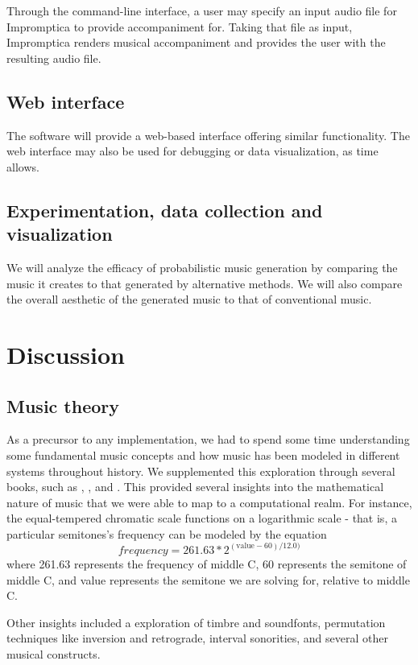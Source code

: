 \documentclass[11pt,conference,letterpaper]{IEEEtran}
\begin{document}
Through the command-line interface, a user may specify an input audio file for Impromptica to provide accompaniment for. Taking that file as input, Impromptica renders musical accompaniment and provides the user with the resulting audio file.

\subsection{Web interface}

The software will provide a web-based interface offering similar functionality. The web interface may also be used for debugging or data visualization, as time allows.

\subsection{Experimentation, data collection and visualization}

We will analyze the efficacy of probabilistic music generation by comparing the music it creates to that generated by alternative methods.  We will also compare the overall aesthetic of the generated music to that of conventional music.

\section{Discussion}

\subsection {Music theory}
As a precursor to any implementation, we had to spend some time understanding some fundamental music concepts and how music has been modeled in different systems throughout history. We supplemented this exploration through several books, such as \cite{temperly2007mprob}, \cite{krogerGeeksNerds}, and \cite{loy2006musimathics}. This provided several insights into the mathematical nature of music that we were able to map to a computational realm. For instance, the equal-tempered chromatic scale functions on a logarithmic scale - that is, a particular semitones's frequency can be modeled by the equation
{\small
	\[frequency = 261.63 * 2^{(\text{value} - 60) / 12.0)}\]
}
where 261.63 represents the frequency of middle C, 60 represents the semitone of middle C, and value represents the semitone we are solving for, relative to middle C.

Other insights included a exploration of timbre and soundfonts, permutation techniques like inversion and retrograde, interval sonorities, and several other musical constructs.
\end{document}
